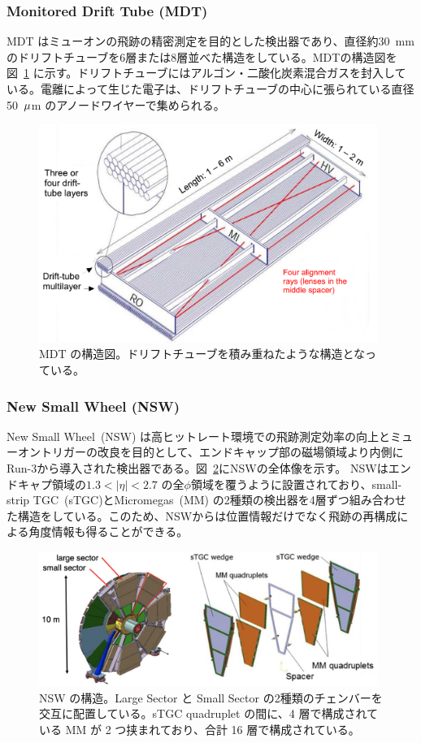 \subsubsection{Monitored Drift Tube (MDT)}
MDT はミューオンの飛跡の精密測定を目的とした検出器であり、直径約30~mmのドリフトチューブを6層または8層並べた構造をしている。MDTの構造図を図~\ref{fig:MDT} に示す。ドリフトチューブにはアルゴン・二酸化炭素混合ガスを封入している。電離によって生じた電子は、ドリフトチューブの中心に張られている直径50~$\rm{\mu}$m のアノードワイヤーで集められる。


\begin{figure}[tb]
  \centering
  \includegraphics[clip, width=11cm]{fig/2/MDT_chamber_schematics_2.pdf}
  \caption{MDT の構造図\cite{Aad:1129811}。ドリフトチューブを積み重ねたような構造となっている。}
  \label{fig:MDT}
\end{figure}


\subsubsection{New Small Wheel (NSW)}
New Small Wheel~(NSW) は高ヒットレート環境での飛跡測定効率の向上とミューオントリガーの改良を目的として、エンドキャップ部の磁場領域より内側にRun-3から導入された検出器である。図~\ref{fig:NSW}にNSWの全体像を示す。
NSWはエンドキャプ領域の$1.3 < |\eta| < 2.7$ の全$\phi$領域を覆うように設置されており、small-strip TGC~(sTGC)とMicromegas~(MM) の2種類の検出器を4層ずつ組み合わせた構造をしている。このため、NSWからは位置情報だけでなく飛跡の再構成による角度情報も得ることができる。

\begin{figure}[tb]
  \centering
  \includegraphics[clip, width=11cm]{fig/2/nsw-structure.png}
  \caption{NSW の構造\cite{article:NSW}。Large Sector と Small Sector の2種類のチェンバーを交互に配置している。sTGC quadruplet の間に、4 層で構成されている MM が 2 つ挟まれており、合計 16 層で構成されている。}
  \label{fig:NSW}
\end{figure}

